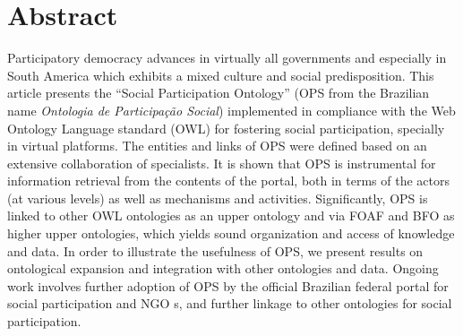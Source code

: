 \documentclass[10pt,letterpaper]{article}
\begin{document}
\section*{Abstract}
Participatory democracy advances in virtually all governments and especially in South America
which exhibits a mixed culture and social predisposition.
This article presents the ``Social Participation Ontology'' 
(OPS from the Brazilian name \emph{Ontologia de Participação Social})
implemented in compliance with the Web Ontology Language standard (OWL)
for fostering social participation, specially in virtual platforms.
The entities and links of OPS were defined based on an extensive collaboration of specialists.
It is shown that OPS is instrumental for information retrieval from the contents of the portal,
both in terms of the actors (at various levels) as well as mechanisms and activities.
Significantly, OPS is linked to other OWL ontologies as an upper ontology
and via FOAF and BFO as higher upper ontologies,
which yields sound organization and access of knowledge and data.
In order to illustrate the usefulness of OPS, we present results on ontological expansion
and integration with other ontologies and data.
Ongoing work involves further adoption of OPS by the official
Brazilian federal portal for social participation and NGO s,
and further linkage to other ontologies for social participation.
%
\end{document}

